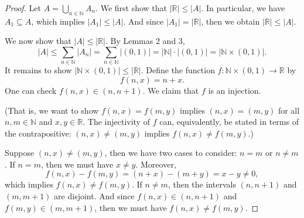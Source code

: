 \documentclass[12pt]{article}
\theoremstyle{definition}
\newcommand{\N}{\mathbb{N}}
\newcommand{\R}{\mathbb{R}}
\begin{document}
\begin{proof}
    Let $A = \bigcup_{n\in\N} A_n$. We first show that $|\R| \leq |A|$. In particular, we have $A_1 \subseteq A$, which implies $|A_1| \leq |A|$. And since $|A_1| = |\R|$, then we obtain $|\R| \leq |A|$.
    
    We now show that $|A| \leq |\R|$. By Lemmas 2 and 3,
    \[
        |A| \leq \sum_{n \in \N}|A_n| = \sum_{n \in \N}|(0,1)| = |\N| \cdot |(0,1)| = |\N \times (0,1)|.
    \]
    It remains to show $|\N \times (0, 1)| \leq |\R|$. Define the function $f : \N \times (0, 1) \to \R$ by
    \[
        f(n, x) = n + x.
    \]
    One can check $f(n, x) \in (n, n+1)$. We claim that $f$ is an injection.
    
    (That is, we want to show $f(n, x) = f(m, y)$ implies $(n, x) = (m, y)$ for all $n, m \in \N$ and $x, y \in \R$. The injectivity of $f$ can, equivalently, be stated in terms of the contrapositive: $(n, x) \ne (m, y)$ implies $f(n, x) \ne f(m, y)$.)
    
    Suppose $(n, x) \ne (m ,y)$, then we have two cases to consider: $n = m$ or $n \ne m$. If $n = m$, then we must have $x \ne y$. Moreover,
    \[
        f(n, x) - f(m, y) = (n + x) - (m + y) = x - y \ne 0,
    \]
    which implies $f(n, x) \ne f(m, y)$. If $n \ne m$, then the intervals $(n, n+1)$ and $(m, m+1)$ are disjoint. And since $f(n, x) \in (n, n+1)$ and $f(m, y) \in (m, m+1)$, then we must have $f(n, x) \ne f(m, y)$.
    
\end{proof}
\end{document}
